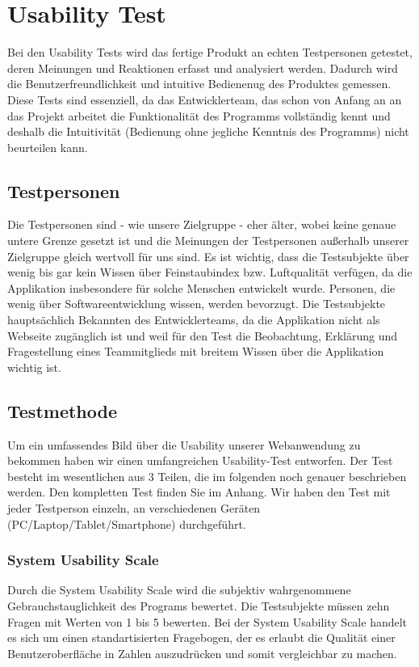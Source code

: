 \section{Usability Test}
Bei den Usability Tests wird das fertige Produkt an echten Testpersonen getestet, deren  Meinungen und Reaktionen erfasst und analysiert werden. Dadurch wird die Benutzerfreundlichkeit und intuitive Bedienenug des Produktes gemessen. Diese Tests sind essenziell, da das Entwicklerteam, das schon von Anfang an an das Projekt arbeitet die Funktionalität des Programms vollständig kennt und deshalb die Intuitivität (Bedienung ohne jegliche Kenntnis des Programms) nicht beurteilen kann.

  \subsection{Testpersonen}
    Die Testpersonen sind - wie unsere Zielgruppe - eher älter, wobei keine genaue untere Grenze gesetzt ist und die Meinungen der Testpersonen außerhalb unserer Zielgruppe gleich wertvoll für uns sind. Es ist wichtig, dass die Testsubjekte über wenig bis gar kein Wissen über Feinstaubindex bzw. Luftqualität verfügen, da die Applikation insbesondere für solche Menschen entwickelt wurde. Personen, die wenig über Softwareentwicklung wissen, werden bevorzugt. Die Testsubjekte hauptsächlich Bekannten des Entwicklerteams, da die Applikation nicht als Webseite zugänglich ist und weil für den Test die Beobachtung, Erklärung und Fragestellung eines Teammitglieds mit breitem Wissen über die Applikation wichtig ist.

  \subsection{Testmethode}
    Um ein umfassendes Bild über die Usability unserer Webanwendung zu bekommen haben wir einen umfangreichen Usability-Test entworfen. Der Test besteht im wesentlichen aus 3 Teilen, die im folgenden noch genauer beschrieben werden. Den kompletten Test finden Sie im Anhang.
    Wir haben den Test mit jeder Testperson einzeln, an verschiedenen Geräten (PC/Laptop/Tablet/Smartphone) durchgeführt.

    \subsubsection*{System Usability Scale}
      Durch die System Usability Scale wird die subjektiv wahrgenommene Gebrauchstauglichkeit des Programs bewertet. Die Testsubjekte müssen zehn Fragen mit Werten von 1 bis 5 bewerten. Bei der System Usability Scale handelt es sich um einen standartisierten Fragebogen, der es erlaubt die Qualität einer Benutzeroberfläche in Zahlen auszudrücken und somit vergleichbar zu machen.
      
